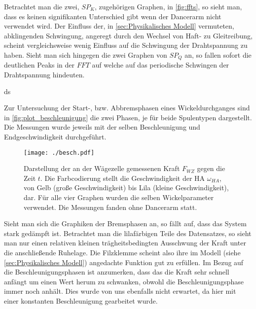 Betrachtet man die zwei, $SP_K$, zugehörigen Graphen, in \autoref{fig:ffts}, so sieht man, dass es keinen signifikanten Unterschied gibt wenn der Dancerarm nicht verwendet wird. Der Einfluss der, in \autoref{sec:Physikalisches Modell} vermuteten, abklingenden Schwingung, angeregt durch den Wechsel von Haft- zu Gleitreibung, scheint vergleichsweise wenig Einfluss auf die Schwingung der Drahtspannung zu haben. Sieht man sich hingegen die zwei Graphen von $SP_Q$ an, so fallen sofort die deutlichen Peaks in der $FFT$ auf  welche auf das periodische Schwingen der Drahtspannung hindeuten.

ds\newline

Zur Untersuchung der Start-, bzw. Abbremsphasen eines Wickeldurchganges sind in \autoref{fig:plot_beschleunigung} die zwei Phasen, je für beide Spulentypen dargestellt. Die Messungen wurde jeweils mit der selben Beschleunigung und Endgeschwindigkeit durchgeführt.


\begin{figure}[H]
    \centering
    \texttt{[image: ./besch.pdf]}
    \caption{Darstellung der an der Wägezelle gemessenen Kraft $F_{WZ}$ gegen die Zeit $t$. Die Farbcodierung stellt die Geschwindigkeit der HA $\omega_{HA}$, von Gelb (große Geschwindigkeit) bis Lila (kleine Geschwindigkeit), dar. Für alle vier Graphen wurden die selben Wickelparameter verwendet. Die Messungen fanden ohne Dancerarm statt.}
    \label{fig:plot_beschleunigung}
\end{figure}

Sieht man sich die Graphiken der Bremsphasen an, so fällt auf, dass das System stark gedämpft ist. Betrachtet man die lilafärbigen Teile des Datensatzes, so sieht man nur einen relativen kleinen trägheitsbedingten Ausschwung der Kraft unter die anschließende Ruhelage. Die Filzklemme scheint also ihre im Modell (siehe \autoref{sec:Physikalisches Modell}) angedachte Funktion gut zu erfüllen. Im Bezug auf die Beschleunigungsphasen ist anzumerken, dass das die Kraft sehr schnell anfängt um einen Wert herum zu schwanken, obwohl die Beschleunigungsphase immer noch anhält. Dies wurde von uns ebenfalls nicht erwartet, da hier mit einer konstanten Beschleunigung gearbeitet wurde.  




